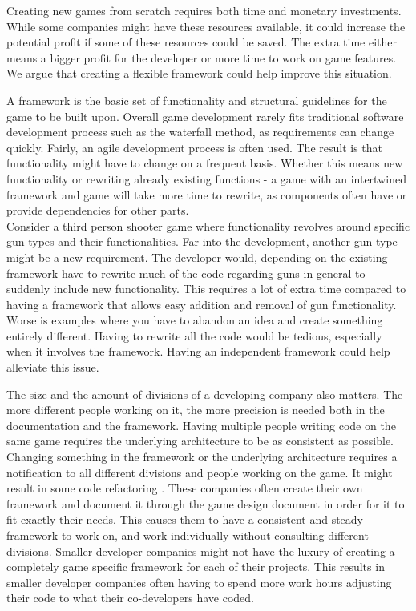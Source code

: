 Creating new games from scratch requires both time and monetary investments. While some companies might have these resources available, it could increase the potential profit if some of these resources could be saved. The extra time either means a bigger profit for the developer or more time to work on game features. We argue that creating a flexible framework could help improve this situation.

A framework is the basic set of functionality and structural guidelines for the game to be built upon. Overall game development rarely fits traditional software development process such as the waterfall method, as requirements can change quickly. Fairly, an agile development process is often used\cite{Gamedevelopment}. The result is that functionality might have to change on a frequent basis. Whether this means new functionality or rewriting already existing functions - a game with an intertwined framework and game will take more time to rewrite, as components often have or provide dependencies for other parts.\\

Consider a third person shooter game where functionality revolves around specific gun types and their functionalities. Far into the development, another gun type might be a new requirement. The developer would, depending on the existing framework have to rewrite much of the code regarding guns in general to suddenly include new functionality. This requires a lot of extra time compared to having a framework that allows easy addition and removal of gun functionality. Worse is examples where you have to abandon an idea and create something entirely different. Having to rewrite all the code would be tedious, especially when it involves the framework. Having an independent framework could help alleviate this issue.

The size and the amount of divisions of a developing company also matters. The more different people working on it, the more precision is needed both in the documentation and the framework. Having multiple people writing code on the same game requires the underlying architecture to be as consistent as possible. Changing something in the framework or the underlying architecture requires a notification to all different divisions and people working on the game. It might result in some code refactoring \cite{Gameprod}. These companies often create their own framework and document it through the game design document \cite{Gamedesign} in order for it to fit exactly their needs. This causes them to have a consistent and steady framework to work on, and work individually without consulting different divisions. Smaller developer companies might not have the luxury of creating a completely game specific framework for each of their projects. This results in smaller developer companies often having to spend more work hours adjusting their code to what their co-developers have coded.

